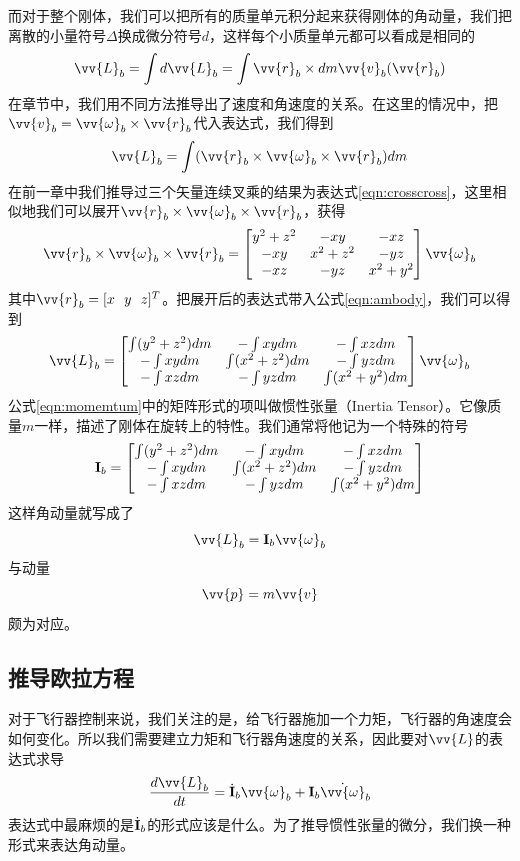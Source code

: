 \documentclass[11pt]{article}
\begin{document}
而对于整个刚体，我们可以把所有的质量单元积分起来获得刚体的角动量，我们把离散的小量符号$\Delta$换成微分符号$d$，这样每个小质量单元都可以看成是相同的
$$
\vv{L}_b = \int d\vv{L}_b = \int \vv{r}_b \times dm \vv{v}_b(\vv{r}_b)
$$
在章节\label{sec:angular}中，我们用不同方法推导出了速度和角速度的关系。在这里的情况中，把$\vv{v}_b = \vv{\omega}_b\times\vv{r}_b$代入表达式，我们得到
\begin{equation}\label{eqn:ambody}
\vv{L}_b = \int (\vv{r}_b \times \vv{\omega}_b\times\vv{r}_b) dm
\end{equation}
在前一章中我们推导过三个矢量连续叉乘的结果为表达式\ref{eqn:crosscross}，这里相似地我们可以展开$\vv{r}_b \times \vv{\omega}_b\times\vv{r}_b$，获得
$$
\vv{r}_b \times \vv{\omega}_b \times\vv{r}_b = 
\begin{bmatrix}
y^2+z^2	&	-xy		&	-xz	\\
-xy		&	x^2+z^2	&	-yz	\\
-xz		&	-yz		&	x^2+y^2
\end{bmatrix}\vv{\omega}_b
$$
其中$\vv{r}_b = [x \ \ y \ \ z]^T$。把展开后的表达式带入公式\ref{eqn:ambody}，我们可以得到
\begin{equation}\label{eqn:momemtum}
\vv{L}_b = 
\begin{bmatrix}
\int (y^2+z^2) dm	&	-\int xy dm		&	-\int xz dm	\\
-\int xy dm		&	\int (x^2+z^2) dm	&	-\int yz dm	\\
-\int xz dm		&	-\int yz dm		&	\int (x^2+y^2) dm
\end{bmatrix}\vv{\omega}_b
\end{equation}
公式\ref{eqn:momemtum}中的矩阵形式的项叫做惯性张量（Inertia Tensor）。它像质量$m$一样，描述了刚体在旋转上的特性。我们通常将他记为一个特殊的符号
$$
{\bf I}_b = 
\begin{bmatrix}
\int (y^2+z^2) dm	&	-\int xy dm		&	-\int xz dm	\\
-\int xy dm		&	\int (x^2+z^2) dm	&	-\int yz dm	\\
-\int xz dm		&	-\int yz dm		&	\int (x^2+y^2) dm
\end{bmatrix}
$$
这样角动量就写成了
$$
\vv{L}_b = {\bf I}_b\vv{\omega}_b
$$
与动量
$$
\vv{p} = m\vv{v}
$$
颇为对应。

\subsection{推导欧拉方程}
对于飞行器控制来说，我们关注的是，给飞行器施加一个力矩，飞行器的角速度会如何变化。所以我们需要建立力矩和飞行器角速度的关系，因此要对$\vv{L}$的表达式求导
$$
\frac{d\vv{L}_b}{dt} = \dot{{\bf I}}_b\vv{\omega}_b + {\bf I}_b \dot{\vv{\omega}}_b   
$$
表达式中最麻烦的是$\dot{{\bf I}}_b$的形式应该是什么。为了推导惯性张量的微分，我们换一种形式来表达角动量。
\end{document}

